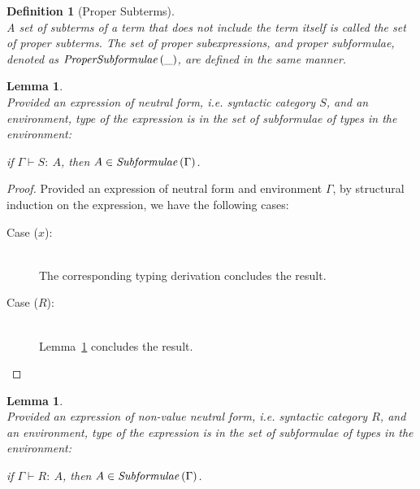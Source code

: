 \documentclass[a4paper]{article}
\newcommand{\typecolor}{}
\newcommand{\termcolor}{}
\newcommand{\tp}[1]{{\typecolor #1}}
\newcommand{\tm}[1]{{\termcolor #1}}
\newtheorem{lemma}[theorem]{Lemma}
\newtheorem{definition}{Definition}
\newcommand{\expvar}[1]{#1}
\newcommand{\env}{\tp{\Gamma}}
\newcommand{\typing}[2]{\tm{#1:\ }\tp{#2}}
\newcommand{\txt}[1]{\text{\textit{#1}}}
\newcommand{\subformulae}[1]{\txt{Subformulae}\,(#1)}
\newcommand{\psubformulae}[1]{\txt{ProperSubformulae}\,(#1)}
\begin{document}
\begin{definition}[Proper Subterms]\ \\
A set of subterms of a term that does not include the term itself is
called the set of proper subterms. The set of proper subexpressions,
and proper subformulae, denoted as $\psubformulae{\_}$, are defined
in the same manner.
\end{definition}

\begin{lemma}\ \\
\label{sub_S}
Provided an expression of neutral form, i.e. syntactic category $S$,
and an environment, type of the expression is in the set of
subformulae of types in the environment:
 
 if $\env \vdash \typing{S}{A}$, then $A \in \subformulae{\Gamma}$.
\end{lemma}

\begin{proof}
Provided an expression of neutral form and environment $\Gamma$,
by structural induction on the expression, we have the following cases:
\begin{description}
\item[Case ($\expvar{x}$):]\ \\ 
  The corresponding typing derivation concludes the result.
\item[Case ($R$):]\ \\
  Lemma~\ref{sub_R} concludes the result.   
\end{description}

\end{proof}

\begin{lemma}\ \\
\label{sub_R}
Provided an expression of non-value neutral form, i.e. syntactic
category $R$, and an environment, type of the expression is in the set
of subformulae of types in the environment:
 
 if $\Gamma \vdash \typing{R}{A}$, then $A \in \subformulae{\Gamma}$.
\end{lemma}
\end{document}
